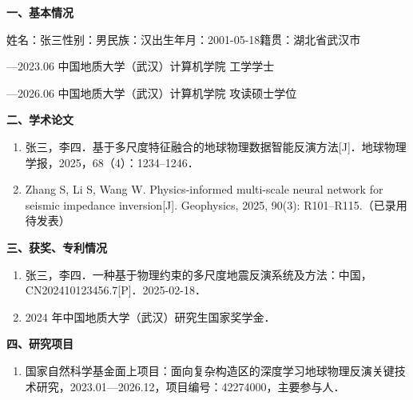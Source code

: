 \begin{resume}[作者简介]

\noindent\textbf{一、基本情况}

\noindent 姓名：张三\hspace{0.9em}性别：男\hspace{0.9em}民族：汉\hspace{0.9em}出生年月：2001-05-18\hspace{0.9em}籍贯：湖北省武汉市

—2023.06 \quad 中国地质大学（武汉）计算机学院 \quad 工学学士

—2026.06 \quad 中国地质大学（武汉）计算机学院 \quad 攻读硕士学位

\vspace{6bp}
\noindent\textbf{二、学术论文}

\begin{enumerate}[label=\arabic*., leftmargin=1.8em]
  \item 张三，李四．基于多尺度特征融合的地球物理数据智能反演方法[J]．地球物理学报，2025，68（4）：1234--1246．
  \item Zhang S, Li S, Wang W. Physics-informed multi-scale neural network for seismic impedance inversion[J]. Geophysics, 2025, 90(3): R101--R115.（已录用待发表）
\end{enumerate}

\vspace{6bp}
\noindent\textbf{三、获奖、专利情况}

\begin{enumerate}[label=\arabic*., leftmargin=1.8em]
  \item 张三，李四．一种基于物理约束的多尺度地震反演系统及方法：中国，\allowbreak CN202410123456.7[P]．2025-02-18．
  \item 2024 年中国地质大学（武汉）研究生国家奖学金．
\end{enumerate}

\vspace{6bp}
\noindent\textbf{四、研究项目}

\begin{enumerate}[label=\arabic*., leftmargin=1.8em]
  \item 国家自然科学基金面上项目：面向复杂构造区的深度学习地球物理反演关键技术研究，2023.01—2026.12，项目编号：42274000，主要参与人．
\end{enumerate}

\end{resume}
